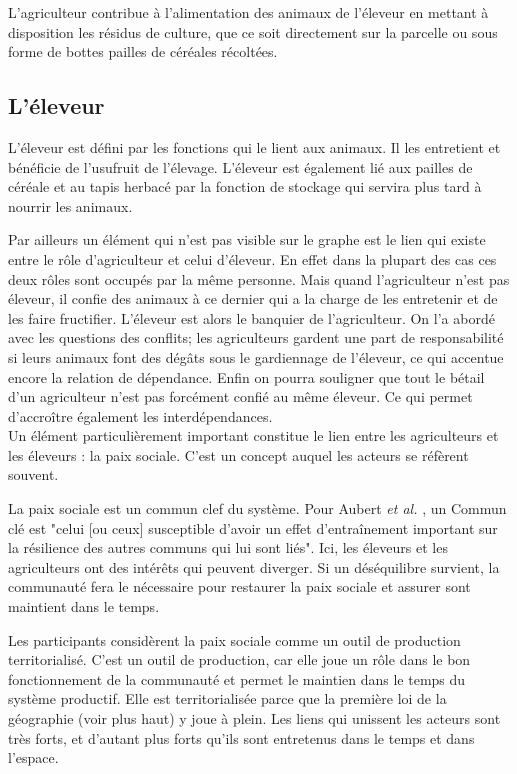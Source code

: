 L'agriculteur contribue à l'alimentation des animaux de l'éleveur en mettant à disposition les résidus de culture, que ce soit directement sur la parcelle ou sous forme de bottes pailles de céréales récoltées.

\subsection{L'éleveur}
L'éleveur est défini par les fonctions qui le lient aux animaux. Il les entretient et bénéficie de l'usufruit de l'élevage. L'éleveur est également lié aux pailles de céréale et au tapis herbacé par la fonction de stockage qui servira plus tard à nourrir les animaux.

Par ailleurs un élément qui n'est pas visible sur le graphe est le lien qui existe entre le rôle d'agriculteur et celui d'éleveur. En effet dans la plupart des cas ces deux rôles sont occupés par la même personne. Mais quand l'agriculteur n'est pas éleveur, il confie des animaux à ce dernier qui a la charge de les entretenir et de les faire fructifier. L'éleveur est alors le banquier de l'agriculteur. On l'a abordé avec les questions des conflits; les agriculteurs gardent une part de responsabilité si leurs animaux font des dégâts sous le gardiennage de l'éleveur, ce qui accentue encore la relation de dépendance. Enfin on pourra souligner que tout le bétail d'un agriculteur n'est pas forcément confié au même éleveur. Ce qui permet d'accroître également les interdépendances.\\

Un élément particulièrement important constitue le lien entre les agriculteurs et les éleveurs : la paix sociale. C'est un concept auquel les acteurs se réfèrent souvent.

La paix sociale est un commun clef du système. Pour Aubert \textit{et al.} \cite{land_tenure_and_development_technical_committee_opportunities_2017}, un Commun clé est "celui [ou ceux] susceptible d’avoir un effet d’entraînement important sur la résilience des autres communs qui lui sont liés". Ici, les éleveurs et les agriculteurs ont des intérêts qui peuvent diverger. Si un déséquilibre survient, la communauté fera le nécessaire pour restaurer la paix sociale et assurer sont maintient dans le temps.

Les participants considèrent la paix sociale comme un outil de production territorialisé. C'est un outil de production, car elle joue un rôle dans le bon fonctionnement de la communauté et permet le maintien dans le temps du système productif. Elle est territorialisée parce que la première loi de la géographie (voir plus haut) y joue à plein. Les liens qui unissent les acteurs sont très forts, et d'autant plus forts qu'ils sont entretenus dans le temps et dans l'espace.

